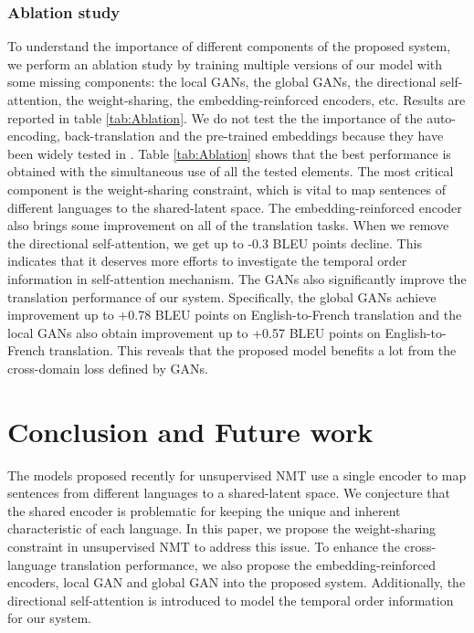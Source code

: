 \documentclass[11pt,a4paper]{article}
\begin{document}
\subsubsection{Ablation study}
To understand the importance of different components of the proposed system, we perform an ablation study by training multiple versions of our model with some missing components: the local GANs, the global GANs, the directional self-attention, the weight-sharing, the embedding-reinforced encoders, etc. Results are reported in table \ref{tab:Ablation}. We do not test the the importance of the auto-encoding, back-translation and the pre-trained embeddings because they have been widely tested in \cite{Lample2017Unsupervised,Artetxe2017Unsupervised}. Table \ref{tab:Ablation} shows that the best performance is obtained with the simultaneous use of all the tested elements. The most critical component is the weight-sharing constraint, which is vital to map sentences of different languages to the shared-latent space. The embedding-reinforced encoder also brings some improvement on all of the translation tasks. When we remove the directional self-attention, we get up to -0.3 BLEU points decline. This indicates that it deserves more efforts to investigate the temporal order information in self-attention mechanism. The GANs also significantly improve the translation performance of our system. Specifically, the global GANs achieve improvement up to +0.78 BLEU points on English-to-French translation and the local GANs also obtain improvement up to +0.57 BLEU points on English-to-French translation. This reveals that the proposed model benefits a lot from the cross-domain loss defined by GANs.

\section{Conclusion and Future work}
The models proposed recently for unsupervised NMT use a single encoder to map sentences from different languages to a shared-latent space. We conjecture that the shared encoder is problematic for keeping the unique and inherent characteristic of each language. In this paper, we propose the weight-sharing constraint in unsupervised NMT to address this issue. To enhance the cross-language translation performance, we also propose the embedding-reinforced encoders, local GAN and global GAN into the proposed system. Additionally, the directional self-attention is introduced to model the temporal order information for our system.
\end{document}
